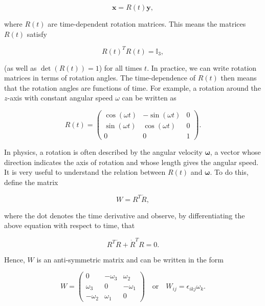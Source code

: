 \documentclass[a4paper,12pt]{report}
\begin{document}
\begin{equation}
\mathbf{x} = R(t) \mathbf{y} ,
\end{equation}

where \( R(t) \) are time-dependent rotation matrices. This means the matrices \( R(t) \) satisfy

\begin{equation}
R(t)^T R(t) = \mathbb{I}_3 ,
\end{equation}

(as well as \(\det(R(t)) = 1\)) for all times \( t \). In practice, we can write rotation matrices in terms of rotation angles. The time-dependence of \( R(t) \) then means that the rotation angles are functions of time. For example, a rotation around the \( z \)-axis with constant angular speed \(\omega\) can be written as

\begin{equation}
R(t) = 
\begin{pmatrix}
\cos(\omega t) & -\sin(\omega t) & 0 \\
\sin(\omega t) & \cos(\omega t) & 0 \\
0 & 0 & 1
\end{pmatrix}.
\end{equation}

In physics, a rotation is often described by the angular velocity \(\boldsymbol{\omega}\), a vector whose direction indicates the axis of rotation and whose length gives the angular speed. It is very useful to understand the relation between \( R(t) \) and \(\boldsymbol{\omega}\). To do this, define the matrix

\begin{equation}
W = R^T \dot{R} ,
\end{equation}

where the dot denotes the time derivative and observe, by differentiating the above equation with respect to time, that

\begin{equation}
R^T \dot{R} + \dot{R}^T R = 0 .
\end{equation}

Hence, \( W \) is an anti-symmetric matrix and can be written in the form

\begin{equation}
W = 
\begin{pmatrix}
0 & -\omega_3 & \omega_2 \\
\omega_3 & 0 & -\omega_1 \\
-\omega_2 & \omega_1 & 0
\end{pmatrix}
\quad \text{or} \quad
W_{ij} = \epsilon_{ikj} \omega_k .
\end{equation}
\end{document}
